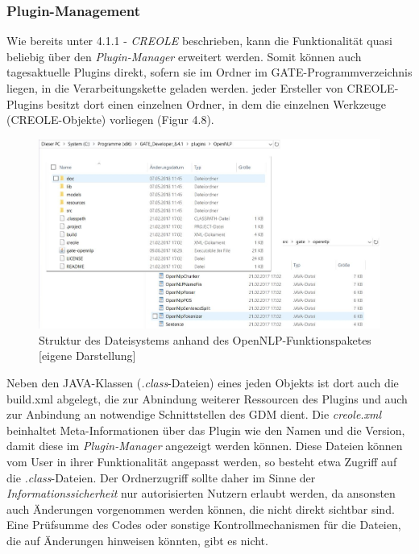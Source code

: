 \documentclass[12pt]{report}
\begin{document}
\subsubsection{Plugin-Management}
Wie bereits unter 4.1.1 - \textit{CREOLE} beschrieben, kann die Funktionalität quasi beliebig über den \textit{Plugin-Manager} erweitert werden. Somit können auch tagesaktuelle Plugins direkt, sofern sie im Ordner im GATE-Programmverzeichnis liegen, in die Verarbeitungskette geladen werden. jeder Ersteller von CREOLE-Plugins besitzt dort einen einzelnen Ordner, in dem die einzelnen Werkzeuge (CREOLE-Objekte) vorliegen (Figur 4.8). 
 
\begin{figure}[h!]
\begin{center}
\includegraphics[scale=0.55]{GATE_Bilder/PluginOrdner.jpg}
\caption{Struktur des Dateisystems anhand des OpenNLP-Funktionspaketes [eigene Darstellung]}
\end{center}
\end{figure} 

Neben den JAVA-Klassen (\textit{.class}-Dateien) eines jeden Objekts ist dort auch die build.xml abgelegt, die zur Abnindung weiterer Ressourcen des Plugins und auch zur Anbindung an notwendige Schnittstellen des GDM dient. Die \textit{creole.xml} beinhaltet Meta-Informationen über das Plugin wie den Namen und die Version, damit diese im \textit{Plugin-Manager} angezeigt werden können. Diese Dateien können vom User in ihrer Funktionalität angepasst werden, so besteht etwa Zugriff auf die \textit{.class}-Dateien. Der Ordnerzugriff sollte daher im Sinne der \textit{Informationssicherheit} nur autorisierten Nutzern erlaubt werden, da ansonsten auch Änderungen vorgenommen werden können, die nicht direkt sichtbar sind. Eine Prüfsumme des Codes oder sonstige Kontrollmechanismen für die Dateien, die auf Änderungen hinweisen könnten, gibt es nicht.\\
\end{document}

